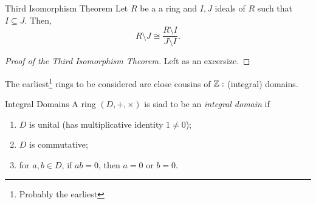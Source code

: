 \documentclass[twoside, openright, fontsize=10pt, headings=big]{scrbook}
\begin{document}
\begin{theorem}{Third Isomorphism Theorem}{}
    Let $R$ be a a ring and $I,J$ ideals of $R$ such that $I\subseteq J$. Then,
    \[
        R\setminus J\cong \frac{R\setminus I}{J\setminus I}.
    \]
\end{theorem}
\begin{proof}[Proof of the Third Isomorphism Theorem]
    Left as an excersize.
\end{proof}
The earliest\footnote{Probably the earliest} rings to be considered are close cousins of $\mathbb{Z}:$ (integral) domains.
\begin{definition}{Integral Domains}{}
    A ring $(D,+,\times)$ is siad to be an \textit{integral domain} if
    \begin{enumerate}
        \item $D$ is unital (has multiplicative identity $1\neq 0$);
        \item $D$ is commutative;
        \item for $a,b\in D$, if $ab=0$, then $a=0$ or $b=0$.
    \end{enumerate}
\end{definition}
\end{document}
